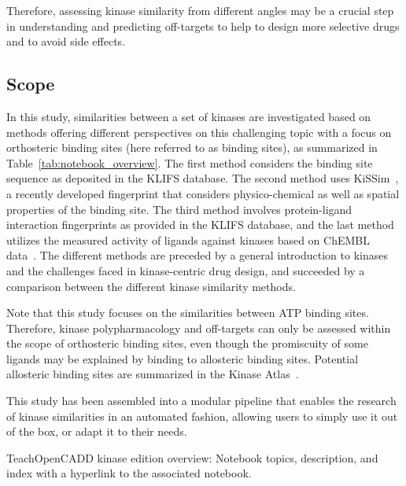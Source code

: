 \documentclass[9pt,training,ASAPversion]{livecoms}
\begin{document}
Therefore, assessing kinase similarity from different angles may be a crucial step in understanding and predicting off-targets to help to design more selective drugs and to avoid side effects.

\subsection{Scope}
In this study, similarities between a set of kinases are investigated based on methods offering different perspectives on this challenging topic with a focus on orthosteric binding sites (here referred to as binding sites), as summarized in Table~\ref{tab:notebook_overview}. The first method considers the binding site sequence as deposited in the KLIFS database. The second method uses KiSSim~\cite{sydow_2022_jcim}, a recently developed fingerprint that considers physico-chemical as well as spatial properties of the binding site. The third method involves protein-ligand interaction fingerprints as provided in the KLIFS database, and the last method utilizes the measured activity of ligands against kinases based on ChEMBL data~\cite{Gaulton_2016_nar}. The different methods are preceded by a general introduction to kinases and the challenges faced in kinase-centric drug design, and succeeded by a comparison between the different kinase similarity methods.

Note that this study focuses on the similarities between ATP binding sites. Therefore, kinase polypharmacology and off-targets can only be assessed within the scope of orthosteric binding sites, even though the promiscuity of some ligands may be explained by binding to allosteric binding sites. Potential allosteric binding sites are summarized in the Kinase Atlas~\cite{Yueh_2019_JMedChem}.  

This study has been assembled into a modular pipeline that enables the research of kinase similarities in an automated fashion, allowing users to simply use it out of the box, or adapt it to their needs.

\begin{table}
    \centering
    
    \caption{TeachOpenCADD kinase edition overview: Notebook topics, description, and index with a hyperlink to the associated notebook.}
    \label{tab:notebook_overview}
\end{table}
\end{document}
